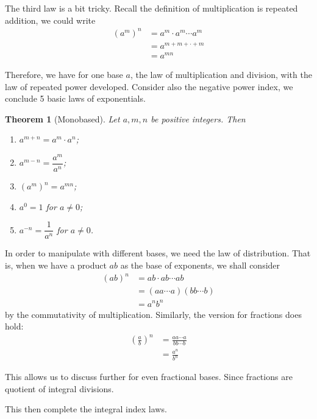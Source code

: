 \documentclass[12pt]{article}
\newtheorem*{theorem}{Theorem}
\begin{document}
    The third law is a bit tricky. Recall the definition of multiplication is repeated addition, we could write \begin{align*}
        (a^m)^n&=a^m\cdot a^m\cdots a^m\\
        &=a^{m+m+\cdot+m}\\
        &=a^{mn}
    \end{align*}

    Therefore, we have for one base $a$, the law of multiplication and division, with the law of repeated power developed. Consider also the negative power index, we conclude 5 basic laws of exponentials.

    \begin{theorem}[Monobased]
        Let $a, m, n$ be positive integers. Then\begin{enumerate}
            \item $a^{m+n}=a^m\cdot a^n$;
            \item $a^{m-n}=\dfrac{a^m}{a^n}$;
            \item $(a^m)^n=a^{mn}$;
            \item $a^0=1$ for $a\neq 0$;
            \item $a^{-n}=\dfrac{1}{a^n}$ for $a\neq 0$.
        \end{enumerate}
    \end{theorem}

    In order to manipulate with different bases, we need the law of distribution. That is, when we have a product $ab$ as the base of exponents, we shall consider \begin{align*}
        (ab)^n&=ab\cdot ab\cdots ab\\
        &=(aa\cdots a)(bb\cdots b)\\
        &=a^n b^n
    \end{align*}
    by the commutativity of multiplication. Similarly, the version for fractions does hold:\begin{align*}
        (\frac{a}{b})^n&=\frac{aa\cdots a}{bb\cdots b}\\
        &=\frac{a^n}{b^n}
    \end{align*}

    This allows us to discuss further for even fractional bases. Since fractions are quotient of integral divisions.

    This then complete the integral index laws.
\end{document}

